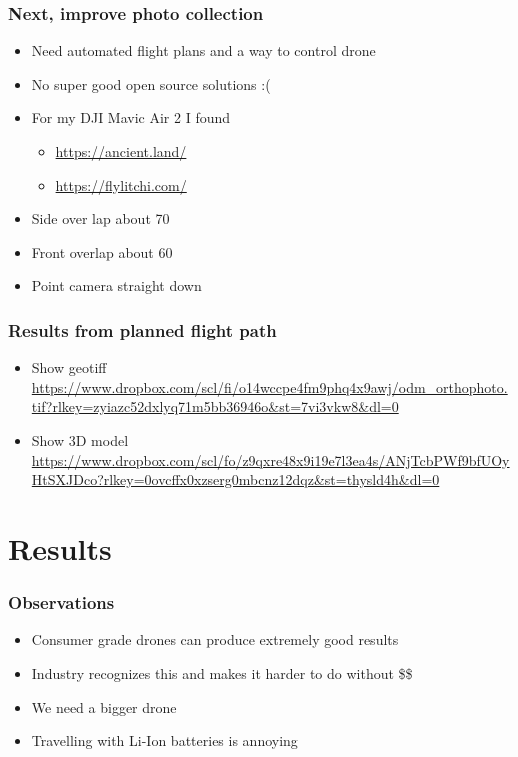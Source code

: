 \documentclass{beamer}
\begin{document}
\begin{frame}
\frametitle{Next, improve photo collection}

\begin{itemize}
\item Need automated flight plans and a way to control drone
\item No super good open source solutions :(
\item For my DJI Mavic Air 2 I found
	\begin{itemize}
		\item \tiny\url{https://ancient.land/}
		\item \tiny\url{https://flylitchi.com/}
	\end{itemize}
\item Side over lap about 70%
\item Front overlap about 60%
\item Point camera straight down
\end{itemize}

\end{frame}

\begin{frame}
\frametitle{Results from planned flight path}

\begin{itemize}
	\item Show geotiff \tiny\url{https://www.dropbox.com/scl/fi/o14wccpe4fm9phq4x9awj/odm_orthophoto.tif?rlkey=zyiazc52dxlyq71m5bb36946o&st=7vi3vkw8&dl=0}
	\item Show 3D model \tiny\url{https://www.dropbox.com/scl/fo/z9qxre48x9i19e7l3ea4s/ANjTcbPWf9bfUOyHtSXJDco?rlkey=0ovcffx0xzserg0mbcnz12dqz&st=thysld4h&dl=0}
\end{itemize}

\end{frame}

\section{Results}

\begin{frame}

\frametitle{Observations}

\begin{itemize}
\item Consumer grade drones can produce extremely good results
\item Industry recognizes this and makes it harder to do without \$\$
\item We need a bigger drone
\item Travelling with Li-Ion batteries is annoying
\end{itemize}

\end{frame}
\end{document}

